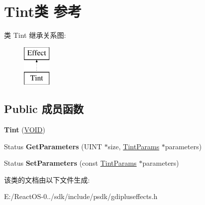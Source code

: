 \hypertarget{class_tint}{}\section{Tint类 参考}
\label{class_tint}
类 Tint 继承关系图\+:\begin{figure}[H]
\begin{center}
\leavevmode
\includegraphics[height=2.000000cm]{class_tint}
\end{center}
\end{figure}
\subsection*{Public 成员函数}
\begin{DoxyCompactItemize}
\item 
\mbox{\label{class_tint_ad89a296911d6014db5e1e2405759fcfa}} 
{\bfseries Tint} (\hyperlink{interfacevoid}{V\+O\+ID})
\item 
\mbox{\label{class_tint_ae02a8cf55c4736e11443a138e1913555}} 
Status {\bfseries Get\+Parameters} (U\+I\+NT $\ast$size, \hyperlink{struct_tint_params}{Tint\+Params} $\ast$parameters)
\item 
\mbox{\label{class_tint_a88581cb9529b5b52b3bc4e73df4581bb}} 
Status {\bfseries Set\+Parameters} (const \hyperlink{struct_tint_params}{Tint\+Params} $\ast$parameters)
\end{DoxyCompactItemize}


该类的文档由以下文件生成\+:\begin{DoxyCompactItemize}
\item 
E\+:/\+React\+O\+S-\/0../sdk/include/psdk/gdipluseffects.\+h\end{DoxyCompactItemize}
